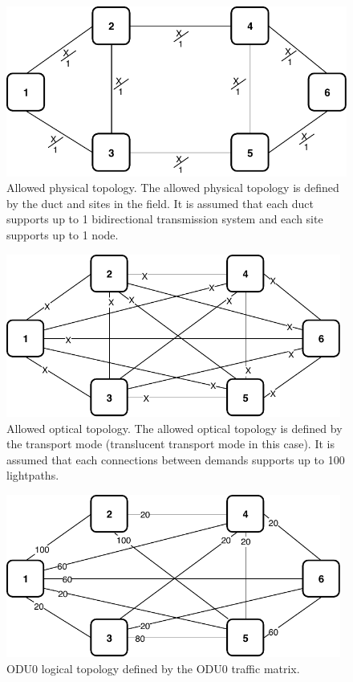 \begin{figure}[h!]
\centering
\includegraphics[width=12cm]{sdf/ilp/translucent_protection/figures/allowed_physical_topology}
\caption{Allowed physical topology. The allowed physical topology is defined by the duct and sites in the field. It is assumed that each duct supports up to 1 bidirectional transmission system and each site supports up to 1 node.}
\label{allowed3_physical_protectionhigh}
\end{figure}
\newpage
\begin{figure}[h!]
\centering
\includegraphics[width=11cm]{sdf/ilp/translucent_protection/figures/allowed_optical_topology}
\caption{Allowed optical topology. The allowed optical topology is defined by the transport mode (translucent transport mode in this case). It is assumed that each connections between demands supports up to 100 lightpaths.}
\label{allowed3_optical_protectionhigh}
\end{figure}

\begin{figure}[h!]
\centering
\includegraphics[width=11cm]{sdf/ilp/translucent_protection/figures/logical_topology_ODU0_high}
\caption{ODU0 logical topology defined by the ODU0 traffic matrix.}
\label{logical3_ODU0_protectionhigh}
\end{figure}

